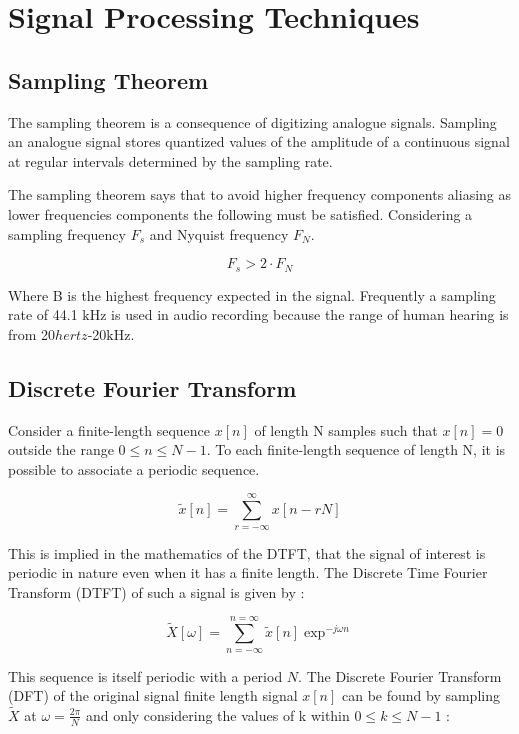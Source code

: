 \section{Signal Processing Techniques}
\subsection{Sampling Theorem}

The sampling theorem is a consequence of digitizing analogue signals. Sampling
an analogue signal stores quantized values of the amplitude of a continuous
signal at regular intervals determined by the sampling rate.

The sampling theorem says that to avoid higher frequency components aliasing as
lower frequencies components the following must be satisfied. Considering a
sampling frequency $F_{s}$ and Nyquist frequency $F_{N}$.

\begin{equation}
  F_{s} > 2\cdot F_{N}
\end{equation}

Where B is the highest frequency expected in the signal. Frequently a sampling
rate of 44.1 $\si{\kilo\hertz}$ is used in audio recording because the range of
human hearing is from 20$\si{hertz}$-20$\si{\kilo\hertz}$.

\subsection{Discrete Fourier Transform}

Consider a finite-length sequence $x[n]$ of length N samples such that $x[n] =
  0$ outside the range $0 \leq  n \leq N - 1$. To each finite-length
sequence of length N, it is possible to associate a periodic sequence.

\begin{equation}
  \tilde{x}[n] =\sum_{r=-\infty}^{\infty} x[n-r N]
\end{equation}

This is implied in the mathematics of the DTFT, that the signal of interest is
periodic in nature even when it has a finite length. The Discrete Time Fourier
Transform (DTFT) of such a signal is given by :

\begin{equation}
  \tilde{X}[\omega] =\sum_{n=-\infty}^{n=\infty} \tilde{x}[n] \exp^{-j \omega n }
\end{equation}

This sequence is itself periodic with a period $N$. The Discrete Fourier
Transform (DFT) of the original signal finite length signal $x[n]$ can be found
by sampling $\tilde{X}$ at $\omega=\frac{2 \pi}{N}$ and only considering the
values of k within $0 \leq  k \leq N - 1$ :

